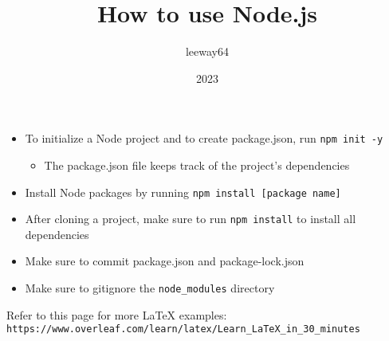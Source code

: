 \documentclass[12pt, letterpaper]{article}
\title{How to use Node.js}
\author{leeway64}
\date{2023}
\begin{document}
\maketitle

\begin{itemize}
    \item To initialize a Node project and to create package.json, run \verb|npm init -y|
        \begin{itemize}
            \item The package.json file keeps track of the project's dependencies
        \end{itemize}
    \item Install Node packages by running \verb|npm install [package name]|
    \item After cloning a project, make sure to run \verb|npm install| to install all dependencies
    \item Make sure to commit package.json and package-lock.json
    \item Make sure to gitignore the \verb|node_modules| directory
\end{itemize}

Refer to this page for more LaTeX examples: \\\verb|https://www.overleaf.com/learn/latex/Learn_LaTeX_in_30_minutes|
\end{document}
